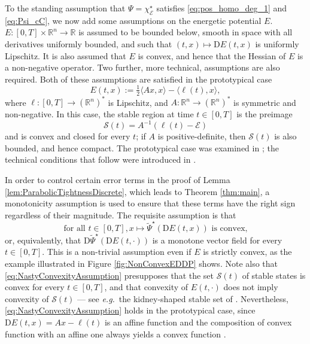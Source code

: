 \documentclass[reqno]{amsart}
\theoremstyle{definition}
\begin{document}
To the standing assumption that $\Psi = \chi_{\mathcal{E}}^{\star}$ satisfies \eqref{eq:pos_homo_deg_1} and \eqref{eq:Psi_cC}, we now add some assumptions on the energetic potential $E$.  $E \colon [0, T] \times {\mathbb{R}}^{n} \to {\mathbb{R}}$ is assumed to be bounded below, smooth in space with all derivatives uniformly bounded, and such that $(t, x) \mapsto {\mathrm{D}} E(t, x)$ is uniformly Lipschitz.  It is also assumed that $E$ is convex, and hence that the Hessian of $E$ is a non-negative operator.  Two further, more technical, assumptions are also required.  Both of these assumptions are satisfied in the prototypical case
\[
	E(t, x) := \tfrac{1}{2} \langle A x, x \rangle - \langle \ell(t), x \rangle,
\]
where $\ell \colon [0, T] \to ({\mathbb{R}}^{n})^{\ast}$ is Lipschitz, and $A \colon {\mathbb{R}}^{n} \to ({\mathbb{R}}^{n})^{\ast}$ is symmetric and non-negative.  In this case, the stable region at time $t \in [0, T]$ is the preimage
\[
	{\mathcal{S}}(t) = A^{-1} ( \ell(t) - {\mathcal{E}} )
\]
and is convex and closed for every $t$;  if $A$ is positive-definite, then ${\mathcal{S}}(t)$ is also bounded, and hence compact.  The prototypical case was examined in \cite{SullivanKoslowskiTheilOrtiz:2009};  the technical conditions that follow were introduced in \cite{Sullivan:2009}.

In order to control certain error terms in the proof of Lemma \ref{lem:ParabolicTightnessDiscrete}, which leads to Theorem \ref{thm:main}, a monotonicity assumption is used to ensure that these terms have the right sign regardless of their magnitude.  The requisite assumption is that
\begin{equation}
	\label{eq:NastyConvexityAssumption}
	\text{for all } t \in [0, T], x \mapsto {\widetilde{\Psi}}^{\star} ({\mathrm{D}} E(t, x)) \text{ is convex,}
\end{equation}
or, equivalently, that ${\mathrm{D}} {\widetilde{\Psi}}^{\star} ({\mathrm{D}} E(t, \cdot))$ is a monotone vector field for every $t \in [0, T]$.  This is a non-trivial assumption even if $E$ is strictly convex, as the example illustrated in Figure \ref{fig:NonConvexEDDP} shows.  Note also that \eqref{eq:NastyConvexityAssumption} presupposes that the set ${\mathcal{S}}(t)$ of stable states is convex for every $t \in [0, T]$, and that convexity of $E(t, \cdot)$ does not imply convexity of $\mathcal{S}(t)$ --- see \emph{e.g.}\ the kidney-shaped stable set of \cite[Example 5.5]{MielkeTheil:2004}.  Nevertheless, \eqref{eq:NastyConvexityAssumption} holds in the prototypical case, since ${\mathrm{D}} E(t, x) = A x - \ell(t)$ is an affine function and the composition of convex function with an affine one always yields a convex function \cite[\S3.2]{BoydVandenberghe:2004}.
\end{document}
